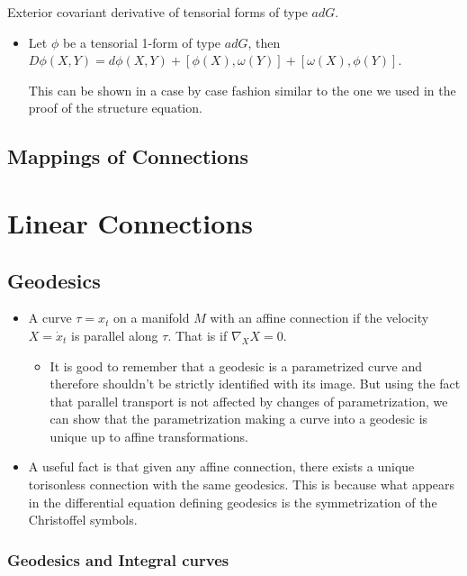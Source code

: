 \documentclass{report}
\theoremstyle{definition}
\begin{document}
Exterior covariant derivative of tensorial forms of type $adG$.
\begin{itemize}
    \item Let $\phi$ be a tensorial 1-form of type $adG$, then $D\phi(X,Y)=d\phi(X,Y)+[\phi(X),\omega(Y)]+[\omega(X),\phi(Y)]$.

    This can be shown in a case by case fashion similar to the one we used in the proof of the structure equation.
\end{itemize}

\section{Mappings of Connections}

\chapter{Linear Connections}

\section{Geodesics}

\begin{itemize}
    \item A curve $\tau=x_t$ on a manifold $M$ with an affine connection if the velocity $X=\dot{x}_t$ is parallel along $\tau$. That is if $\nabla_XX=0$.
    \begin{itemize}
        \item It is good to remember that a geodesic is a parametrized curve and therefore shouldn't be strictly identified with its image. But using the fact that parallel transport is not affected by changes of parametrization, we can show that the parametrization making a curve into a geodesic is unique up to affine transformations.
    \end{itemize}
    \item A useful fact is that given any affine connection, there exists a unique torisonless connection with the same geodesics. This is because what appears in the differential equation defining geodesics is the symmetrization of the Christoffel symbols.
\end{itemize}


\subsection{Geodesics and Integral curves}
\end{document}
